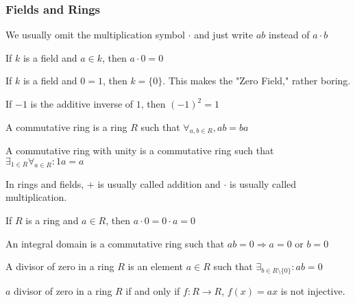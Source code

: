             \subsubsection{Fields and Rings}
                We usually omit the multiplication symbol $\cdot$ and just
                write $ab$ instead of $a\cdot b$
                \begin{theorem}
                    If $k$ is a field and $a\in k$,
                    then $a\cdot 0=0$
                \end{theorem}
                If $k$ is a field and $0=1$, then $k=\{0\}$.
                This makes the "Zero Field," rather boring.
                \begin{theorem}
                    If $-1$ is the additive inverse of $1$,
                    then $(-1)^2=1$
                \end{theorem}
                \begin{definition}
                    A commutative ring is a ring $R$
                    such that $\forall_{a,b\in R},ab=ba$
                \end{definition}
                \begin{definition}
                    A commutative ring with unity is a
                    commutative ring such that
                    $\exists_{1\in R}\forall_{a\in R}:1a=a$
                \end{definition}
                In rings and fields, $+$ is usually called addition and
                $\cdot$ is usually called multiplication.
                \begin{corollary}
                    If $R$ is a ring and $a\in R$,
                    then $a\cdot 0 = 0\cdot a=0$
                \end{corollary}
                \begin{definition}
                    An integral domain is a commutative
                    ring such that $ab=0\Rightarrow a=0$ or $b=0$
                \end{definition}
                \begin{definition}
                    A divisor of zero in a ring $R$ is an element $a\in R$
                    such that $\exists_{b\in R\setminus\{0\}}:ab=0$
                \end{definition}
                \begin{theorem}
                    $a$ divisor of zero in a ring $R$ if and only if
                    $f:R\rightarrow R$, $f(x)=ax$ is not injective.
                \end{theorem}
